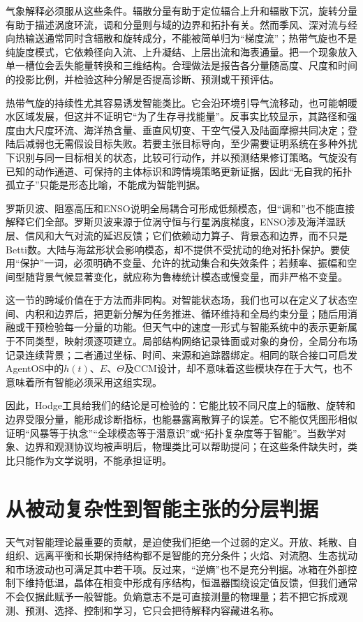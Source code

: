 气象解释必须服从这些条件。辐散分量有助于定位辐合上升和辐散下沉，旋转分量有助于描述涡度环流，调和分量则与域的边界和拓扑有关。然而季风、深对流与经向热输送通常同时含辐散和旋转成分，不能被简单归为“梯度流”；热带气旋也不是纯旋度模式，它依赖径向入流、上升凝结、上层出流和海表通量。把一个现象放入单一槽位会丢失能量转换和三维结构。合理做法是报告各分量随高度、尺度和时间的投影比例，并检验这种分解是否提高诊断、预测或干预评估。

热带气旋的持续性尤其容易诱发智能类比。它会沿环境引导气流移动，也可能朝暖水区域发展，但这并不证明它“为了生存寻找能量”。反事实比较显示，其路径和强度由大尺度环流、海洋热含量、垂直风切变、干空气侵入及陆面摩擦共同决定；登陆后减弱也无需假设目标失败。若要主张目标导向，至少需要证明系统在多种外扰下识别与同一目标相关的状态，比较可行动作，并以预测结果修订策略。气旋没有已知的动作通道、可保持的主体标识和跨情境策略更新证据，因此“无自我的拓扑孤立子”只能是形态比喻，不能成为智能判据。

罗斯贝波、阻塞高压和ENSO说明全局耦合可形成低频模态，但“调和”也不能直接解释它们全部。罗斯贝波来源于位涡守恒与行星涡度梯度，ENSO涉及海洋温跃层、信风和大气对流的延迟反馈；它们依赖动力算子、背景态和边界，而不只是Betti数。大陆与海盆形状会影响模态，却不提供不受扰动的绝对拓扑保护。要使用“保护”一词，必须明确不变量、允许的扰动集合和失效条件；若频率、振幅和空间型随背景气候显著变化，就应称为鲁棒统计模态或慢变量，而非严格不变量。

这一节的跨域价值在于方法而非同构。对智能状态场，我们也可以在定义了状态空间、内积和边界后，把更新分解为任务推进、循环维持和全局约束分量；随后用消融或干预检验每一分量的功能。但天气中的速度一形式与智能系统中的表示更新属于不同类型，映射须逐项建立。局部结构网络记录锋面或对象的身份，全局分布场记录连续背景；二者通过坐标、时间、来源和追踪器绑定。相同的联合接口可启发AgentOS中的$h(t)$、$E$、$\Theta$及CCM设计，却不意味着这些模块存在于大气，也不意味着所有智能必须采用这组实现。

因此，Hodge工具给我们的结论是可检验的：它能比较不同尺度上的辐散、旋转和边界受限分量，能形成诊断指标，也能暴露离散算子的误差。它不能仅凭图形相似证明“风暴等于执念”“全球模态等于潜意识”或“拓扑复杂度等于智能”。当数学对象、边界和观测协议均被声明后，物理类比可以帮助提问；在这些条件缺失时，类比只能作为文学说明，不能承担证明。

\section{从被动复杂性到智能主张的分层判据}
\label{sec:ultimate_boundary_criterion}

天气对智能理论最重要的贡献，是迫使我们拒绝一个过弱的定义。开放、耗散、自组织、远离平衡和长期保持结构都不是智能的充分条件；火焰、对流胞、生态扰动和市场波动也可满足其中若干项。反过来，“逆熵”也不是充分判据。冰箱在外部控制下维持低温，晶体在相变中形成有序结构，恒温器围绕设定值反馈，但我们通常不会仅据此赋予一般智能。负熵意志不是可直接测量的物理量；若不把它拆成观测、预测、选择、控制和学习，它只会把待解释内容藏进名称。

